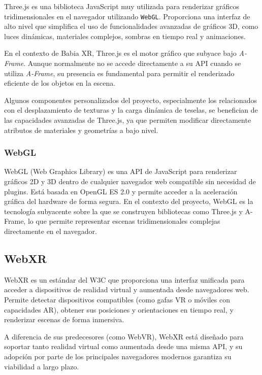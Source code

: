 \documentclass[a4paper, 12pt]{book}
\begin{document}
Three.js es una biblioteca JavaScript muy utilizada para renderizar gráficos tridimensionales en el navegador utilizando \texttt{WebGL}. Proporciona una interfaz de alto nivel que simplifica el uso de funcionalidades avanzadas de gráficos 3D, como luces dinámicas, materiales complejos, sombras en tiempo real y animaciones.

En el contexto de Babia XR, Three.js es el motor gráfico que subyace bajo \textit{A-Frame}. Aunque normalmente no se accede directamente a su API cuando se utiliza \textit{A-Frame}, su presencia es fundamental para permitir el renderizado eficiente de los objetos en la escena.

Algunos componentes personalizados del proyecto, especialmente los relacionados con el desplazamiento de texturas y la carga dinámica de teselas, se benefician de las capacidades avanzadas de Three.js, ya que permiten modificar directamente atributos de materiales y geometrías a bajo nivel.

\subsubsection*{WebGL}
\label{subsec:webgl}

WebGL (Web Graphics Library) es una API de JavaScript para renderizar gráficos 2D y 3D dentro de cualquier navegador web compatible sin necesidad de plugins. Está basada en OpenGL ES 2.0 y permite acceder a la aceleración gráfica del hardware de forma segura. En el contexto del proyecto, WebGL es la tecnología subyacente sobre la que se construyen bibliotecas como Three.js y A-Frame, lo que permite representar escenas tridimensionales complejas directamente en el navegador.


\subsection{WebXR}
\label{subsec:webxr}

WebXR es un estándar del W3C que proporciona una interfaz unificada para acceder a dispositivos de realidad virtual y aumentada desde navegadores web. Permite detectar dispositivos compatibles (como gafas VR o móviles con capacidades AR), obtener sus posiciones y orientaciones en tiempo real, y renderizar escenas de forma inmersiva.

A diferencia de sus predecesores (como WebVR), WebXR está diseñado para soportar tanto realidad virtual como aumentada desde una misma API, y su adopción por parte de los principales navegadores modernos garantiza su viabilidad a largo plazo.
\end{document}
